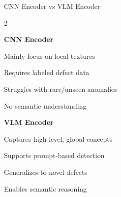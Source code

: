 \begin{frame}{CNN Encoder vs VLM Encoder}

\begin{multicols}{2}

\centering
\textbf{CNN Encoder}\\[0.2cm]

\begin{tcolorbox}[colframe=blue!80!black, colback=blue!5]
\centering
Mainly focus on local textures
\end{tcolorbox}

\vspace{0.1cm}

\begin{tcolorbox}[colframe=green!50!black, colback=green!5]
\centering
Requires labeled defect data
\end{tcolorbox}

\vspace{0.1cm}

\begin{tcolorbox}[colframe=red!70!black, colback=red!5]
\centering
Struggles with rare/unseen anomalies
\end{tcolorbox}

\vspace{0.1cm}

\begin{tcolorbox}[colframe=brown!70!black, colback=brown!5]
\centering
No semantic understanding
\end{tcolorbox}

\columnbreak

\centering
\textbf{VLM Encoder}\\[0.2cm]

\begin{tcolorbox}[colframe=blue!80!black, colback=blue!5]
\centering
Captures high-level, global concepts
\end{tcolorbox}

\vspace{0.1cm}

\begin{tcolorbox}[colframe=green!50!black, colback=green!5]
\centering
Supports prompt-based detection
\end{tcolorbox}

\vspace{0.1cm}

\begin{tcolorbox}[colframe=red!70!black, colback=red!5]
\centering
Generalizes to novel defects
\end{tcolorbox}

\vspace{0.1cm}

\begin{tcolorbox}[colframe=brown!70!black, colback=brown!5]
\centering
Enables semantic reasoning
\end{tcolorbox}
\end{multicols}
\end{frame}
